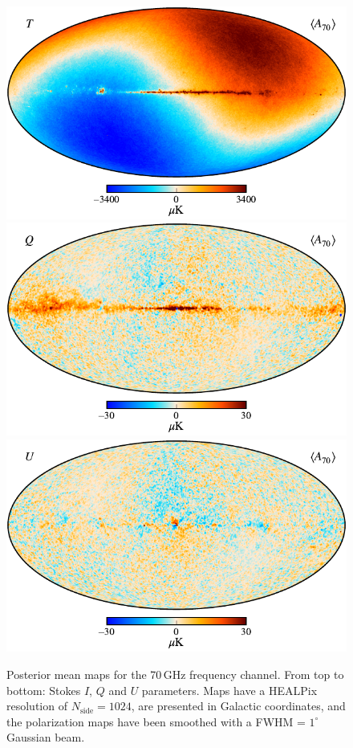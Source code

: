 \documentclass[twocolumn]{aa}
\begin{document}
\begin{figure}[p]
  \center
  \includegraphics[width=12cm]{figs/BP_070_v2_I_MEAN_w12_n1024_cb_c-planck.pdf}\\
  \includegraphics[width=12cm]{figs/BP_070_v2_Q_MEAN_w12_n1024_60arcmin_cb_c-planck.pdf}\\
  \includegraphics[width=12cm]{figs/BP_070_v2_U_MEAN_w12_n1024_60arcmin_cb_c-planck.pdf}
  \caption{Posterior mean maps for the 70\,GHz frequency channel. From top to bottom: Stokes $I$, $Q$ and $U$ parameters. Maps have a HEALPix resolution of $N_{\mathrm{side}} = 1024$, are presented in Galactic coordinates, and the polarization maps have been smoothed with a FWHM = $1^\circ$ Gaussian beam.}\label{fig:freq_maps70}
\end{figure}
\end{document}
